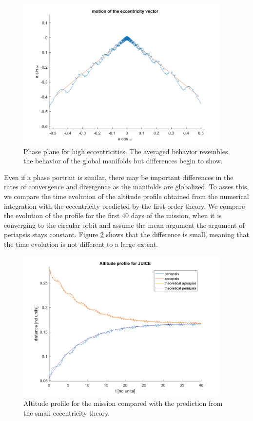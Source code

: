 \begin{figure}[H]
	\centering
	\includegraphics[height=3in]
	{figures/GanymedeESA/eccentricityComparison.png}
	\caption{Phase plane for high eccentricities. The averaged behavior resembles the behavior of the global manifolds but differences begin to show.}
	\label{fig:eccentricityComparisonGlobal}
\end{figure}

Even if a phase portrait is similar, there may be important differences in the rates of convergence and divergence as the manifolds are globalized. To asses this, we compare the time evolution of the altitude profile obtained from the numerical integration with the eccentricity predicted by the first-order theory. We compare the evolution of the profile for the first 40 days of the mission, when it is converging to the circular orbit and assume the mean argument the argument of periapsis stays constant. Figure \ref{fig:missionProfileTheoretical} shows that the difference is small, meaning that the time evolution is not different to a large extent.

\begin{figure}[H]
	\centering
	\includegraphics[height=3in]
	{figures/GanymedeESA/missionProfileTheoretical.png}
	\caption{Altitude profile for the mission compared with the prediction from the small eccentricity theory.}
	\label{fig:missionProfileTheoretical}
\end{figure}

